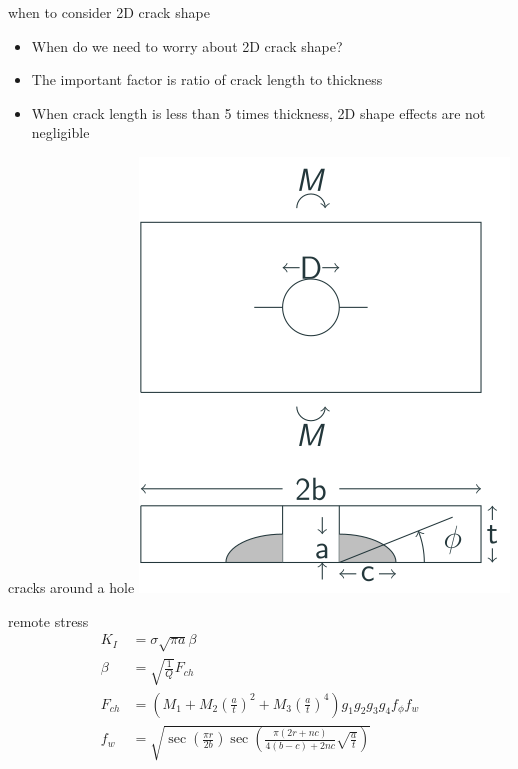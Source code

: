 \documentclass[
  letterpaper,
  ignorenonframetext,
  aspectratio=43,
  handout,
  12pt]{beamer}
\providecommand{\tightlist}{%
  \setlength{\itemsep}{0pt}\setlength{\parskip}{0pt}}
\providecommand{\tightlist}{%
\setlength{\itemsep}{0pt}\setlength{\parskip}{0pt}}
\let\Oldincludegraphics\includegraphics
\renewcommand{\includegraphics}[2][]{\Oldincludegraphics[width=\textwidth,height=0.7\textheight,keepaspectratio]{#2}}
\begin{document}
\begin{frame}{when to consider 2D crack shape}
\protect\hypertarget{when-to-consider-2d-crack-shape}{}
\begin{itemize}
\tightlist
\item
  When do we need to worry about 2D crack shape?
\item
  The important factor is ratio of crack length to thickness
\item
  When crack length is less than 5 times thickness, 2D shape effects are
  not negligible
\end{itemize}
\end{frame}

\begin{frame}{cracks around a hole}
\protect\hypertarget{cracks-around-a-hole-7}{}
\includegraphics{../images/bearing-symmetric-corner.svg}
\end{frame}

\begin{frame}{remote stress}
\protect\hypertarget{remote-stress}{}
\[\begin{aligned}
  K_{I} &= \sigma \sqrt{\pi a} \beta\\
  \beta &= \sqrt{\frac{1}{Q}} F_{ch}\\
  F_{ch} &= \left(M_1 + M_2 \left(\frac{a}{t}\right)^2 + M_3 \left(\frac{a}{t}\right)^4\right)g_1 g_2 g_3 g_4 f_\phi f_w\\
  f_w &= \sqrt{\sec \left(\frac{\pi r}{2b}\right)\sec \left(\frac{\pi (2r + nc)}{4(b-c) + 2nc} \sqrt{\frac{a}{t}}\right)}
\end{aligned}\]
\end{frame}
\end{document}
